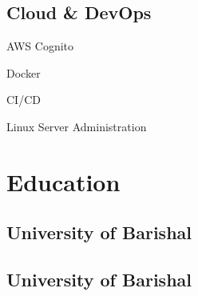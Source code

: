 \documentclass[]{deedy-resume}
\begin{document}
\begin{minipage}[t]{0.33\textwidth}
\subsection{Cloud \& DevOps}
\vspace{\topsep}
\begin{tightemize}
\item AWS Cognito
\item Docker
\item CI/CD
\item Linux Server Administration
\end{tightemize}
\sectionsep

\section{Education}

\subsection{University of Barishal}
\sectionsep

\subsection{University of Barishal}
\sectionsep

\end{minipage}
\hfill
\end{document}

